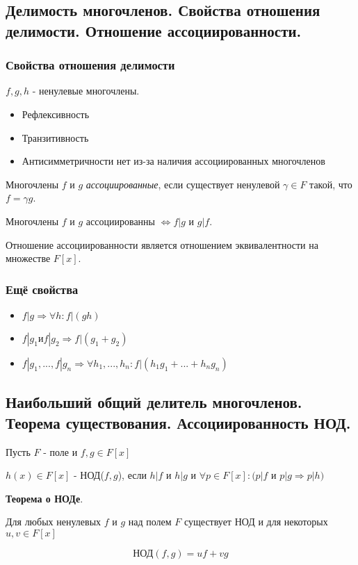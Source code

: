 \documentclass[a4paper]{article}
\begin{document}
\subsection*{Делимость многочленов. Свойства отношения делимости. Отношение ассоциированности.}



\subsubsection*{Свойства отношения делимости}
$f, g, h$ - ненулевые многочлены.
\begin{itemize}
\item Рефлексивность
\item Транзитивность
\item Антисимметричности нет из-за наличия ассоциированных многочленов
\end{itemize}

Многочлены $f$ и $g$ \textit{ассоциированные}, если существует ненулевой $\gamma \in F$ такой, что $f = \gamma g$.

Многочлены $f$ и $g$ ассоциированны $\Leftrightarrow f|g$ и $g|f$.

Отношение ассоциированности является отношением эквивалентности на множестве $F[x]$.

\subsubsection*{Ещё свойства}
\begin{itemize}
\item $f|g \Rightarrow \forall h: f|(gh)$
\item $f|g_1 \text{и} f|g_2 \Rightarrow f|(g_1 + g_2)$
\item $f|g_1, ..., f|g_n \Rightarrow \forall h_1, ..., h_n : f|(h_1g_1 + ... + h_ng_n)$
\end{itemize}

\subsection*{Наибольший общий делитель многочленов. Теорема существования. Ассоциированность НОД.}

Пусть $F$ - поле и $f, g \in F[x]$

$h(x) \in F[x]$ - НОД($f,g$), если $h | f$ и $h|g$ и $\forall p \in F[x]: (p | f$ и $ p | g \Rightarrow p | h)$

\begin{htheorem}\textbf{Теорема о НОДе}.

Для любых ненулевых $f$ и $g$ над полем $F$ существует НОД и для некоторых $u, v \in F[x]$

\[ \text{НОД}(f, g) = uf + vg\]
\end{htheorem}
\end{document}
